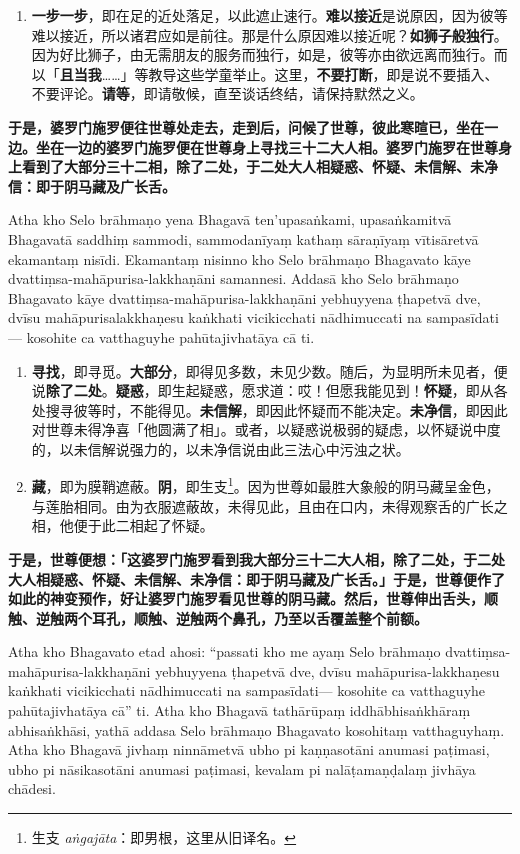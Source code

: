 \begin{enumerate}\item \textbf{一步一步}，即在足的近处落足，以此遮止速行。\textbf{难以接近}是说原因，因为彼等难以接近，所以诸君应如是前往。那是什么原因难以接近呢？\textbf{如狮子般独行}。因为好比狮子，由无需朋友的服务而独行，如是，彼等亦由欲远离而独行。而以「\textbf{且当我}……」等教导这些学童举止。这里，\textbf{不要打断}，即是说不要插入、不要评论。\textbf{请等}，即请敬候，直至谈话终结，请保持默然之义。\end{enumerate}

\textbf{于是，婆罗门施罗便往世尊处走去，走到后，问候了世尊，彼此寒暄已，坐在一边。坐在一边的婆罗门施罗便在世尊身上寻找三十二大人相。婆罗门施罗在世尊身上看到了大部分三十二相，除了二处，于二处大人相疑惑、怀疑、未信解、未净信：即于阴马藏及广长舌。}

Atha kho Selo brāhmaṇo yena Bhagavā ten’upasaṅkami, upasaṅkamitvā Bhagavatā saddhiṃ sammodi, sammodanīyaṃ kathaṃ sāraṇīyaṃ vītisāretvā ekamantaṃ nisīdi. Ekamantaṃ nisinno kho Selo brāhmaṇo Bhagavato kāye dvattiṃsa-mahāpurisa-lakkhaṇāni samannesi. Addasā kho Selo brāhmaṇo Bhagavato kāye dvattiṃsa-mahāpurisa-lakkhaṇāni yebhuyyena ṭhapetvā dve, dvīsu mahāpurisalakkhaṇesu kaṅkhati vicikicchati nādhimuccati na sampasīdati— kosohite ca vatthaguyhe pahūtajivhatāya cā ti.

\begin{enumerate}\item \textbf{寻找}，即寻觅。\textbf{大部分}，即得见多数，未见少数。随后，为显明所未见者，便说\textbf{除了二处}。\textbf{疑惑}，即生起疑惑，愿求道：哎！但愿我能见到！\textbf{怀疑}，即从各处搜寻彼等时，不能得见。\textbf{未信解}，即因此怀疑而不能决定。\textbf{未净信}，即因此对世尊未得净喜「他圆满了相」。或者，以疑惑说极弱的疑虑，以怀疑说中度的，以未信解说强力的，以未净信说由此三法心中污浊之状。
\item \textbf{藏}，即为膜鞘遮蔽。\textbf{阴}，即生支\footnote{生支 \textit{aṅgajāta}：即男根，这里从旧译名。}。因为世尊如最胜大象般的阴马藏呈金色，与莲胎相同。由为衣服遮蔽故，未得见此，且由在口内，未得观察舌的广长之相，他便于此二相起了怀疑。\end{enumerate}

\textbf{于是，世尊便想：「这婆罗门施罗看到我大部分三十二大人相，除了二处，于二处大人相疑惑、怀疑、未信解、未净信：即于阴马藏及广长舌。」于是，世尊便作了如此的神变预作，好让婆罗门施罗看见世尊的阴马藏。然后，世尊伸出舌头，顺触、逆触两个耳孔，顺触、逆触两个鼻孔，乃至以舌覆盖整个前额。}

Atha kho Bhagavato etad ahosi: “passati kho me ayaṃ Selo brāhmaṇo dvattiṃsa-mahāpurisa-lakkhaṇāni yebhuyyena ṭhapetvā dve, dvīsu mahāpurisa-lakkhaṇesu kaṅkhati vicikicchati nādhimuccati na sampasīdati— kosohite ca vatthaguyhe pahūtajivhatāya cā” ti. Atha kho Bhagavā tathārūpaṃ iddhābhisaṅkhāraṃ abhisaṅkhāsi, yathā addasa Selo brāhmaṇo Bhagavato kosohitaṃ vatthaguyhaṃ. Atha kho Bhagavā jivhaṃ ninnāmetvā ubho pi kaṇṇasotāni anumasi paṭimasi, ubho pi nāsikasotāni anumasi paṭimasi, kevalam pi nalāṭamaṇḍalaṃ jivhāya chādesi.

